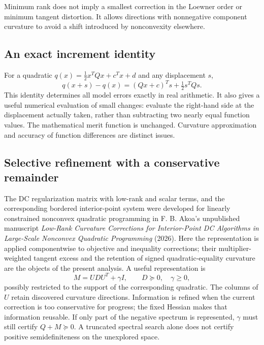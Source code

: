 \documentclass[pdflatex,sn-mathphys-num]{sn-jnl}
\theoremstyle{thmstyleone}
\theoremstyle{thmstylethree}
\begin{document}
Minimum rank does not imply a smallest correction in the Loewner order
or minimum tangent distortion. It allows directions with nonnegative
component curvature to avoid a shift introduced by nonconvexity elsewhere.

\subsection{An exact increment identity}
For a quadratic $q(x)=\tfrac12x^TQx+c^Tx+d$ and any displacement $s$,
\begin{equation}\label{eq:exact-increment}
 q(x+s)-q(x)=(Qx+c)^Ts+\tfrac12s^TQs.
\end{equation}
This identity determines all model errors exactly in real arithmetic.
It also gives a useful numerical evaluation of small changes: evaluate
the right-hand side at the displacement actually taken, rather than
subtracting two nearly equal function values. The mathematical merit
function is unchanged. Curvature approximation and accuracy of function
differences are distinct issues.


\subsection{Selective refinement with a conservative remainder}
The DC regularization matrix with low-rank and scalar terms, and the corresponding bordered interior-point
system were developed for linearly constrained nonconvex quadratic
programming in F. B. Akoa's unpublished manuscript
\emph{Low-Rank Curvature Corrections for Interior-Point DC Algorithms in
Large-Scale Nonconvex Quadratic Programming} (2026).
Here the representation is applied componentwise to objective and
inequality corrections; their multiplier-weighted tangent excess and the
retention of signed quadratic-equality curvature are the objects of the
present analysis. A useful representation is
\begin{equation}\label{eq:lowrank}
 M=UDU^T+\gamma I,\qquad D\succeq0,\quad\gamma\geq0,
\end{equation}
possibly restricted to the support of the corresponding quadratic.
The columns of $U$ retain discovered curvature directions. Information
is refined when the current correction is too conservative for progress;
the fixed Hessian makes that information reusable. If only part of the
negative spectrum is represented, $\gamma$ must still certify
$Q+M\succeq0$. A truncated spectral search alone does not certify
positive semidefiniteness on the unexplored space.
\end{document}
